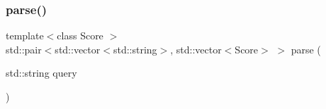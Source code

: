 \mbox{\label{irk-query_8cpp_a72a7accc4aac02043b4942649bd3fe88}} 
\subsubsection{\texorpdfstring{parse()}{parse()}}
{\footnotesize\ttfamily template$<$class Score $>$ \\
std\+::pair$<$std\+::vector$<$std\+::string$>$, std\+::vector$<$Score$>$ $>$ parse (\begin{DoxyParamCaption}\item[{std\+::string}]{query }\end{DoxyParamCaption})}

